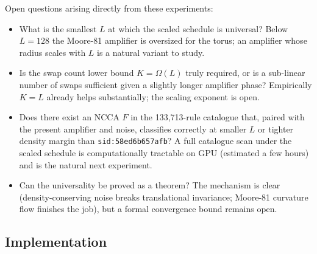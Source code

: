 \documentclass[11pt,a4paper]{article}
\newcommand{\sid}[1]{\texttt{sid:}\allowbreak\texttt{#1}}
\begin{document}
Open questions arising directly from these experiments:
\begin{itemize}
\item What is the smallest \(L\) at which the scaled schedule is universal?
Below \(L=128\) the Moore-81 amplifier is oversized for the torus; an
amplifier whose radius scales with \(L\) is a natural variant to study.
\item Is the swap count lower bound \(K = \Omega(L)\) truly required, or is a
sub-linear number of swaps sufficient given a slightly longer amplifier
phase?  Empirically \(K=L\) already helps substantially; the scaling
exponent is open.
\item Does there exist an NCCA \(F\) in the 133{,}713-rule catalogue that,
paired with the present amplifier and noise, classifies correctly at
smaller \(L\) or tighter density margin than \sid{58ed6b657afb}?  A full
catalogue scan under the scaled schedule is computationally tractable on
GPU (estimated a few hours) and is the natural next experiment.
\item Can the universality be proved as a theorem?  The mechanism is clear
(density-conserving noise breaks translational invariance; Moore-81 curvature
flow finishes the job), but a formal convergence bound remains open.
\end{itemize}

\subsection{Implementation}
\end{document}
